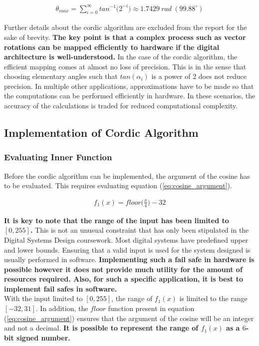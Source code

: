 \documentclass{article}
\begin{document}
\begin{align}
    \theta_{max} = \sum_{i = 0}^{\infty}tan^{-1}\big(2^{-i}\big) \approx 1.7429 \ rad \  (99.88^{\circ})\label{eq:cordic_convergence}
\end{align}

Further details about the cordic algorithm are excluded from the report for the sake of brevity. \textbf{The key point is that a complex process such as vector rotations can be mapped efficiently to hardware if the digital architecture is well-understood.} In the case of the cordic algorithm, the efficient mapping comes at almost no loss of precision. This is in the sense that choosing elementary angles such that $tan(\alpha_{i})$ is a power of $2$ does not reduce precision. In multiple other applications, approximations have to be made so that the computations can be performed efficiently in hardware. In these scenarios, the accuracy of the calculations is traded for reduced computational complexity. 

\subsection{Implementation of Cordic Algorithm}

\subsubsection{Evaluating Inner Function}\label{sec:div_floor_sub}
Before the cordic algorithm can be implemented, the argument of the cosine has to be evaluated. This requires evaluating equation (\ref{eq:cosine_argument}). 

\begin{align}
    f_{1}(x) = floor\big(\frac{x}{4}\big) - 32\label{eq:cosine_argument}
\end{align}

\textbf{It is key to note that the range of the input has been limited to $[0, 255]$.} This is not an unusual constraint that has only been stipulated in the Digital Systems Design coursework. Most digital systems have predefined upper and lower bounds. Ensuring that a valid input is used for the system designed is usually performed in software. \textbf{Implementing such a fail safe in hardware is possible however it does not provide much utility for the amount of resources required. Also, for such a specific application, it is best to implement fail safes in software.}\\

With the input limited to $[0, 255]$, the range of $f_{1}(x)$ is limited to the range $[-32, 31]$. In addition, the $floor$ function present in equation (\ref{eq:cosine_argument}) ensures that the argument of the cosine will be an integer and not a decimal. \textbf{It is possible to represent the range of $f_{1}(x)$ as a $6$-bit signed number.}\\
\end{document}
